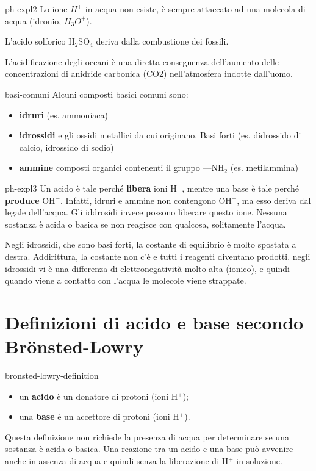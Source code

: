 \documentclass[preview]{standalone}
\begin{document}
\begin{snippet}{ph-expl2}
    Lo ione \(H^+\) in acqua non esiste, è sempre attaccato ad una molecola di acqua (idronio, \(H_3O^+\)).

    L'acido solforico H\({}_2\)SO\({}_4\) deriva dalla combustione dei fossili.

    L'acidificazione degli oceani è una diretta conseguenza dell'aumento delle concentrazioni di anidride carbonica (CO2) nell'atmosfera indotte dall'uomo.
\end{snippet}

\begin{snippet}{basi-comuni}
    Alcuni composti basici comuni sono:
    \begin{itemize}
        \item \textbf{idruri} (es. ammoniaca)
        \item \textbf{idrossidi} e gli ossidi metallici da cui originano. Basi forti (es. didrossido di calcio, idrossido di sodio)
        \item \textbf{ammine} composti organici contenenti il gruppo —NH\({}_2\) (es. metilammina)
    \end{itemize}
\end{snippet}

\begin{snippet}{ph-expl3}
    Un acido è tale perché \textbf{libera} ioni H\({}^+\),
    mentre una base è tale perché \textbf{produce} OH\({}^-\).
    Infatti, idruri e ammine non contengono OH\({}^-\), ma esso deriva dal legale dell'acqua.
    Gli iddrosidi invece possono liberare questo ione.
    Nessuna sostanza è acida o basica se non reagisce con qualcosa, solitamente l'acqua.

    Negli idrossidi, che sono basi forti, la costante di equilibrio è molto spostata a destra.
    Addirittura, la costante non c'è e tutti i reagenti diventano prodotti.
    negli idrossidi vi è una differenza di elettronegatività molto alta (ionico),
    e quindi quando viene a contatto con l'acqua le molecole viene strappate.
\end{snippet}

\section{Definizioni di acido e base secondo Brönsted-Lowry}

\begin{snippet}{bronsted-lowry-definition}
    \begin{itemize}
        \item un \textbf{acido} è un donatore di protoni (ioni H\({}^+\));
        \item una \textbf{base} è un accettore di protoni (ioni H\({}^+\)).
    \end{itemize}
    Questa definizione non richiede la presenza di acqua per determinare se una sostanza
    è acida o basica.
    Una reazione tra un acido e una base può avvenire anche
    in assenza di acqua e quindi senza la liberazione di H\({}^+\) in
    soluzione.
\end{snippet}
\end{document}
